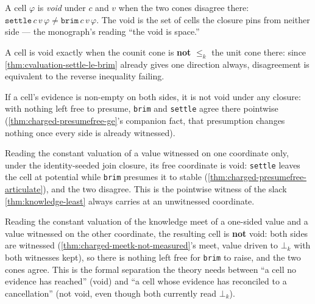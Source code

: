 \begin{definition}\label{thm:cvaluation-void}\leanok{}
A cell \(\varphi\) is \emph{void} under \(c\) and \(v\) when the two cones
disagree there: \(\texttt{settle}\,c\,v\,\varphi \neq \texttt{brim}\,c\,v\,
\varphi\). The void is the set of cells the closure pins from neither side
--- the monograph's reading ``the void is space.''
\end{definition}

\begin{proposition}\label{thm:cvaluation-void-iff}\leanok{}
A cell is void exactly when the counit cone is \textbf{not} \(\le_k\) the
unit cone there: since \cref{thm:cvaluation-settle-le-brim} already gives one
direction always, disagreement is equivalent to the reverse inequality
failing.
\end{proposition}

\begin{theorem}\label{thm:cvaluation-not-void-of-full}\leanok{}
If a cell's evidence is non-empty on both sides, it is not void under any
closure: with nothing left free to presume, \texttt{brim} and \texttt{settle}
agree there pointwise (\cref{thm:charged-presumefree-ge}'s companion fact,
that presumption changes nothing once every side is already witnessed).
\end{theorem}

\begin{theorem}\label{thm:cvaluation-articulate-void}\leanok{}
Reading the constant valuation of a value witnessed on one coordinate only,
under the identity-seeded join closure, its free coordinate is void: \texttt{settle} leaves
the cell at potential while \texttt{brim} presumes it to stable
(\cref{thm:charged-presumefree-articulate}), and the two disagree. This is
the pointwise witness of the slack \cref{thm:knowledge-least} always carries
at an unwitnessed coordinate.
\end{theorem}

\begin{theorem}\label{thm:cvaluation-cancelled-not-void}\leanok{}
Reading the constant valuation of the knowledge meet of a one-sided value and
a value witnessed on the other coordinate, the resulting cell is \textbf{not} void:
both sides are witnessed (\cref{thm:charged-meetk-not-measured}'s meet, value
driven to \(\bot_k\) with both witnesses kept), so there is nothing left free
for \texttt{brim} to raise, and the two cones agree. This is the formal
separation the theory needs between ``a cell no evidence has reached'' (void)
and ``a cell whose evidence has reconciled to a cancellation'' (not void,
even though both currently read \(\bot_k\)).
\end{theorem}
